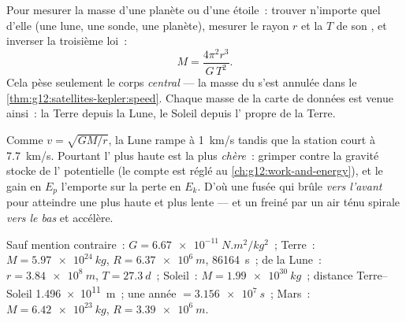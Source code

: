 \begin{method}\label{met:g12:satellites-kepler:weigh}
%
Pour mesurer la masse d'une planète ou d'une étoile~: trouver n'importe
quel  d'elle (une lune, une sonde, une
planète), mesurer le rayon $r$ et la  $T$ de
son , et inverser la troisième loi~:
\[ M = \frac{4\pi^2 r^3}{G\,T^2}. \]
Cela pèse seulement le corps \emph{central} --- la masse du
 s'est annulée dans le
\cref{thm:g12:satellites-kepler:speed}. Chaque masse de la carte de
données est venue ainsi~: la Terre depuis la Lune, le Soleil depuis
l' propre de la Terre.
\end{method}

\begin{remark}\label{rem:g12:satellites-kepler:energy}
Comme $v = \sqrt{GM/r}$, la Lune rampe à \qty{1}{km/s} tandis que la
station court à \qty{7.7}{km/s}. Pourtant l'
plus haute est la plus \emph{chère}~: grimper contre la gravité stocke
de l' potentielle (le compte est réglé au
\cref{ch:g12:work-and-energy}), et le gain en $E_p$ l'emporte sur la
perte en $E_k$. D'où une fusée qui brûle \emph{vers l'avant} pour
atteindre une  plus haute et plus lente --- et
un  freiné par un air ténu
spirale \emph{vers le bas} et accélère.
\end{remark}

\begin{remark}\label{rem:g12:satellites-kepler:data}
Sauf mention contraire~: $G = \qty{6.67e-11}{N.m^2/kg^2}$~; Terre~:
$M = \qty{5.97e24}{kg}$, $R = \qty{6.37e6}{m}$,
 \qty{86164}{s}~;  de
la Lune~: $r = \qty{3.84e8}{m}$, $T = \qty{27.3}{d}$~; Soleil~:
$M = \qty{1.99e30}{kg}$~; distance Terre--Soleil \qty{1.496e11}{m}~; une
année $= \qty{3.156e7}{s}$~; Mars~: $M = \qty{6.42e23}{kg}$,
$R = \qty{3.39e6}{m}$.
\end{remark}

